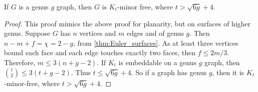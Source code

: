 \begin{theorem}\label{thm:bounded_genus_kt_free}
	If \(G\) is a genus \(g\) graph, then \(G\) is \(K_t\)-minor free, where \(t > \sqrt{6g} + 4\). 
\end{theorem}
\begin{proof}
	This proof mimics the above proof for planarity, but on surfaces of higher genus. 
	Suppose \(G\) has \(n\) vertices and \(m\) edges and of genus $g$. Then \(n - m + f = \chi = 2-g\), from \cref{thm:Euler_surfaces}. As at least three vertices bound each face and each edge touches exactly two faces, then \(f \leq 2m/3\). Therefore, \(m \leq 3(n + g - 2)\). If \(K_t\) is embeddable on a genus \(g\) graph, then \(\binom{t}{2} \leq 3 (t + g - 2)\). Thus \(t \leq \sqrt{6g} + 4\). So if a graph has genus \(g\), then it is \(K_t\)-minor-free, where \(t > \sqrt{6g} + 4\). 
\end{proof}
